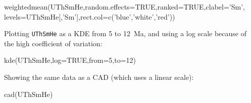 \begin{refsection}
\begin{enumerate}
\begin{script}
weightedmean(UThSmHe,random.effects=TRUE,ranked=TRUE,clabel='Sm',
             levels=UThSmHe[,'Sm'],rect.col=c('blue','white','red'))
\end{script}

Plotting \texttt{UThSmHe} as a KDE from 5 to 12~Ma, and using a log
scale because of the high coefficient of variation:

\begin{console}
kde(UThSmHe,log=TRUE,from=5,to=12)
\end{console}

Showing the same data as a CAD (which uses a linear scale):

\begin{console}
cad(UThSmHe)
\end{console}

\end{enumerate}

\printbibliography[heading=subbibliography]

\end{refsection}
